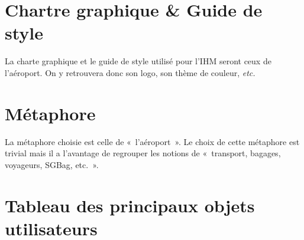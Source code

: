 \section{Chartre graphique \& Guide de style}
La charte graphique et le guide de style utilisé pour l'IHM seront ceux de
l'aéroport. On y retrouvera donc son logo, son thème de couleur, \textsl{etc.}

\section{Métaphore}
La métaphore choisie est celle de «~l'aéroport~». Le choix de cette métaphore
est trivial mais il a l'avantage de regrouper les notions de «~transport,
    bagages, voyageurs, SGBag, etc.~».

\section{Tableau des principaux objets utilisateurs}
\providecommand{\DJSPU}[1]{}

